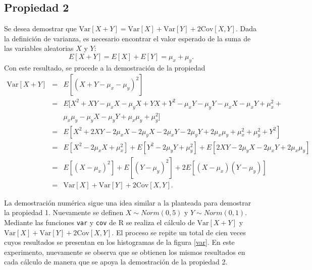 \documentclass[12pt]{article}
\begin{document}
	\subsection{Propiedad 2}

	Se desea demostrar que $\text{Var}[X+Y] = \text{Var}[X] + \text{Var}[Y] + 2\text{Cov}[X, Y]$. Dada la definición de varianza, es necesario encontrar el valor esperado de la suma de las variables aleatorias $X$ y $Y$:
	\begin{equation*}
	E[X+Y] = E[X] + E[Y] = \mu_x + \mu_y.
	\end{equation*}
	Con este resultado, se procede a la demostración de la propiedad
	\begin{eqnarray*}
	\text{Var}[X+Y] &=& E[(X + Y - \mu_x - \mu_y)^2] \\
	&=& E[X^2 + XY - \mu_xX - \mu_yX + YX + Y^2 - \mu_xY - \mu_yY - \mu_xX - \mu_xY + \mu_x^2 + \\
	& & \mu_x\mu_y - \mu_yX - \mu_yY + \mu_x\mu_y + \mu_y^2] \\
	&=& E[X^2 + 2XY - 2\mu_xX - 2\mu_yX - 2\mu_xY - 2\mu_yY + 2\mu_x\mu_y + \mu_x^2 + \mu_y^2 + Y^2] \\
	&=& E[X^2 - 2\mu_xX + \mu_x^2] + E[Y^2 - 2\mu_yY + \mu_y^2] + E[2XY - 2\mu_yX - 2\mu_xY + 2\mu_x\mu_y] \\
	&=& E[(X - \mu_x)^2] + E[(Y-\mu_y)^2] + 2E[(X-\mu_x)(Y-\mu_y)] \\
	&=& \text{Var}[X] + \text{Var}[Y] + 2\text{Cov}[X, Y].
	\end{eqnarray*}

	La demostración numérica sigue una idea similar a la planteada para demostrar la propiedad 1. Nuevamente se definen $X\sim Norm(0,5)$ y $Y \sim Norm(0,1)$. Mediante las funciones \texttt{var} y \texttt{cov} de \textsc{R} se realiza el cálculo de $\text{Var}[X+Y]$ y $\text{Var}[X] + \text{Var}[Y] + 2\text{Cov}[X, Y]$. El proceso se repite un total de cien veces cuyos resultados se presentan en los histogramas de la figura \ref{var}. En este experimento, nuevamente se observa que se obtienen los mismos resultados en cada cálculo de manera que se apoya la demostración de la propiedad 2.
	
\end{document}
